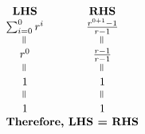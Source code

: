 \documentclass[12pt]{article}
\begin{document}
\[
	\begin{array}{c@{\quad\quad}c}
		\textbf{LHS}        & \textbf{RHS}              \\

		\sum_{i=0}^{0} r^i  & \frac{r^{0+1} - 1}{r - 1} \\
		\rotatebox{90}{$=$} & \rotatebox{90}{$=$}       \\

		r^0                 & \frac{r - 1}{r - 1}       \\
		\rotatebox{90}{$=$} & \rotatebox{90}{$=$}       \\

		1                   & 1                         \\
		\rotatebox{90}{$=$} & \rotatebox{90}{$=$}       \\

		1                   & 1                         \\
		\multicolumn{2}{c}{\textbf{Therefore, LHS = RHS}}
	\end{array}
\]
\end{document}
